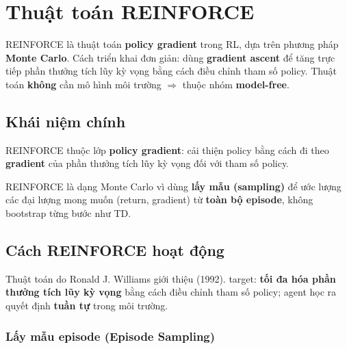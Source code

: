 \section{Thuật toán REINFORCE}
\label{sec:reinforce}

\begin{dinhnghia}[title={REINFORCE Algorithm}]
REINFORCE là thuật toán \textbf{policy gradient} trong RL, dựa trên phương pháp \textbf{Monte Carlo}.
Cách triển khai đơn giản: dùng \textbf{gradient ascent} để tăng trực tiếp phần thưởng tích lũy kỳ vọng bằng cách điều chỉnh tham số policy.
Thuật toán \textbf{không} cần mô hình môi trường $\Rightarrow$ thuộc nhóm \textbf{model-free}.
\end{dinhnghia}

\subsection{Khái niệm chính}

\begin{ynghia}[title={Policy Gradient Methods}]
REINFORCE thuộc lớp \textbf{policy gradient}: cải thiện policy bằng cách đi theo \textbf{gradient} của phần thưởng tích lũy kỳ vọng đối với tham số policy.
\end{ynghia}

\begin{ynghia}[title={Monte Carlo trong REINFORCE}]
REINFORCE là dạng Monte Carlo vì dùng \textbf{lấy mẫu (sampling)} để ước lượng các đại lượng mong muốn (return, gradient) từ \textbf{toàn bộ episode}, không bootstrap từng bước như TD.
\end{ynghia}

\subsection{Cách REINFORCE hoạt động}

\begin{dongco}[title={Lịch sử và target}]
Thuật toán do Ronald J. Williams giới thiệu (1992).
target: \textbf{tối đa hóa phần thưởng tích lũy kỳ vọng} bằng cách điều chỉnh tham số policy; agent học ra quyết định \textbf{tuần tự} trong môi trường.
\end{dongco}

\subsubsection{Lấy mẫu episode (Episode Sampling)}

